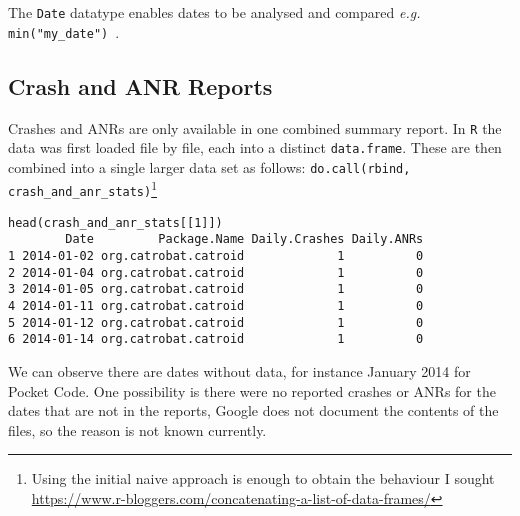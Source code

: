 
The \texttt{Date} datatype enables dates to be analysed and compared \emph{e.g.} \texttt{min("my\_date")}~\cite{r_bloggers_date_formats_in_r}.


\subsection{Crash and ANR Reports}
Crashes and ANRs are only available in one combined summary report. In \texttt{R} the data was first loaded file by file, each into a distinct \texttt{data.frame}. These are then combined into a single larger data set as follows:  
\texttt{do.call(rbind, crash\_and\_anr\_stats)}\footnote{Using the initial naive approach is enough to obtain the behaviour I sought \url{https://www.r-bloggers.com/concatenating-a-list-of-data-frames/}}

\begin{lstlisting}
head(crash_and_anr_stats[[1]])
        Date         Package.Name Daily.Crashes Daily.ANRs
1 2014-01-02 org.catrobat.catroid             1          0
2 2014-01-04 org.catrobat.catroid             1          0
3 2014-01-05 org.catrobat.catroid             1          0
4 2014-01-11 org.catrobat.catroid             1          0
5 2014-01-12 org.catrobat.catroid             1          0
6 2014-01-14 org.catrobat.catroid             1          0
\end{lstlisting}

We can observe there are dates without data, for instance  January 2014 for Pocket Code. One possibility is there were no reported crashes or ANRs for the dates that are not in the reports, Google does not document the contents of the files, so the reason is not known currently.
